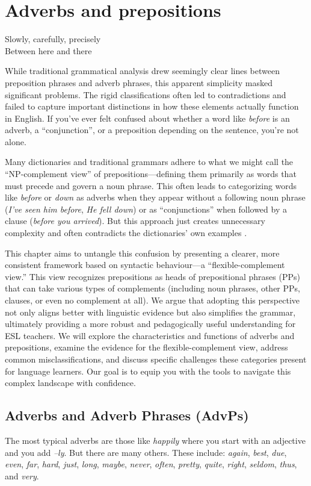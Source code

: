 \chapter{Adverbs and prepositions}

\epigraph{Slowly, carefully, precisely\\Between here and there}{}

\noindent
While traditional grammatical analysis drew seemingly clear lines between preposition phrases and adverb phrases, this apparent simplicity masked significant problems. The rigid classifications often led to contradictions and failed to capture important distinctions in how these elements actually function in English. If you've ever felt confused about whether a word like \textit{before} is an adverb, a ``conjunction'', or a preposition depending on the sentence, you're not alone.

Many dictionaries and traditional grammars adhere to what we might call the ``NP-complement view'' of prepositions---defining them primarily as words that must precede and govern a noun phrase. This often leads to categorizing words like \textit{before} or \textit{down} as adverbs when they appear without a following noun phrase (\textit{I've seen him before}, \textit{He fell down}) or as ``conjunctions'' when followed by a clause (\textit{before you arrived}). But this approach just creates unnecessary complexity and often contradicts the dictionaries' own examples \autocite{reynolds2025}.

This chapter aims to untangle this confusion by presenting a clearer, more consistent framework based on syntactic behaviour---a ``flexible-complement view.'' This view recognizes prepositions as heads of prepositional phrases (PPs) that can take various types of complements (including noun phrases, other PPs, clauses, or even no complement at all). We argue that adopting this perspective not only aligns better with linguistic evidence but also simplifies the grammar, ultimately providing a more robust and pedagogically useful understanding for ESL teachers. We will explore the characteristics and functions of adverbs and prepositions, examine the evidence for the flexible-complement view, address common misclassifications, and discuss specific challenges these categories present for language learners. Our goal is to equip you with the tools to navigate this complex landscape with confidence.

\section{Adverbs and Adverb Phrases (AdvPs)}
The most typical adverbs are those like \textit{happily} where you start with an adjective and you add \textit{--ly}. But there are many others. These include: \textit{again}, \textit{best}, \textit{due}, \textit{even}, \textit{far}, \textit{hard}, \textit{just}, \textit{long}, \textit{maybe}, \textit{never}, \textit{often}, \textit{pretty}, \textit{quite}, \textit{right}, \textit{seldom}, \textit{thus}, and \textit{very}.

